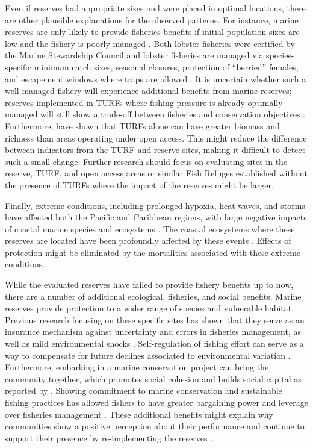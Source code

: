 \documentclass{frontiersSCNS}
\begin{document}
Even if reserves had appropriate sizes and were placed in optimal
locations, there are other plausible explanations for the observed
patterns. For instance, marine reserves are only likely to provide
fisheries benefits if initial population sizes are low and the fishery
is poorly managed \citep{hilborn_2004,hilborn_2006}. Both lobster
fisheries were certified by the Marine Stewardship Council and lobster
fisheries are managed via species-specific minimum catch sizes, seasonal
closures, protection of ``berried'' females, and escapement windows
where traps are allowed \citep{dof_website_1993}. It is uncertain
whether such a well-managed fishery will experience additional benefits
from marine reserves; reserves implemented in TURFs where fishing
pressure is already optimally managed will still show a trade-off
between fisheries and conservation objectives \citep{lester_2017}.
Furthermore, \citet{gelcich_2008} have shown that TURFs alone can have
greater biomass and richness than areas operating under open access.
This might reduce the difference between indicators from the TURF and
reserve sites, making it difficult to detect such a small change.
Further research should focus on evaluating sites in the reserve, TURF,
and open access areas or similar Fish Refuges established without the
presence of TURFs where the impact of the reserves might be larger.

Finally, extreme conditions, including prolonged hypoxia, heat waves,
and storms have affected both the Pacific and Caribbean regions, with
large negative impacts of coastal marine species and ecosystems
\citep{cavole_2016,hughes_2018,breitburg_2018}. The coastal ecosystems
where these reserves are located have been profoundly affected by these
events \citep{micheli_2012-EU,woodson_2018}. Effects of protection might
be eliminated by the mortalities associated with these extreme
conditions.

While the evaluated reserves have failed to provide fishery benefits up
to now, there are a number of additional ecological, fisheries, and
social benefits. Marine reserves provide protection to a wider range of
species and vulnerable habitat. Previous research focusing on these
specific sites has shown that they serve as an insurance mechanism
against uncertainty and errors in fisheries management, as well as mild
environmental shocks
\citep{micheli_2012-EU,deleo_2015,roberts_2017-J9,aalto}.
Self-regulation of fishing effort can serve as a way to compensate for
future declines associated to environmental variation
\citep{finkbeiner_2018}. Furthermore, embarking in a marine conservation
project can bring the community together, which promotes social cohesion
and builds social capital as reported by \citet{fulton_2019}. Showing
commitment to marine conservation and sustainable fishing practices has
allowed fishers to have greater bargaining power and leverage over
fisheries management \citep{prezramrez_2012}. These additional benefits
might explain why communities show a positive perception about their
performance and continue to support their presence by re-implementing
the reserves \citep{ayer_2018}.
\end{document}
